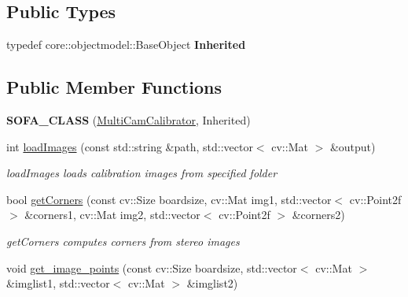 \subsection*{Public Types}
\begin{DoxyCompactItemize}
\item 
\mbox{\label{classsofa_1_1rgbdtracking_1_1_multi_cam_calibrator_a3ce8331b99321a13884a6c0cea468f72}} 
typedef core\+::objectmodel\+::\+Base\+Object {\bfseries Inherited}
\end{DoxyCompactItemize}
\subsection*{Public Member Functions}
\begin{DoxyCompactItemize}
\item 
\mbox{\label{classsofa_1_1rgbdtracking_1_1_multi_cam_calibrator_afe02f454d01807003120c2105b5a7e5e}} 
{\bfseries S\+O\+F\+A\+\_\+\+C\+L\+A\+SS} (\hyperlink{classsofa_1_1rgbdtracking_1_1_multi_cam_calibrator}{Multi\+Cam\+Calibrator}, Inherited)
\item 
int \hyperlink{classsofa_1_1rgbdtracking_1_1_multi_cam_calibrator_a57189fd694afe501755e15c483fecd12}{load\+Images} (const std\+::string \&path, std\+::vector$<$ cv\+::\+Mat $>$ \&output)
\begin{DoxyCompactList}\small\item\em load\+Images loads calibration images from specified folder \end{DoxyCompactList}\item 
bool \hyperlink{classsofa_1_1rgbdtracking_1_1_multi_cam_calibrator_aa59f42320d2dcd3f3d28239ff0fb4eda}{get\+Corners} (const cv\+::\+Size boardsize, cv\+::\+Mat img1, std\+::vector$<$ cv\+::\+Point2f $>$ \&corners1, cv\+::\+Mat img2, std\+::vector$<$ cv\+::\+Point2f $>$ \&corners2)
\begin{DoxyCompactList}\small\item\em get\+Corners computes corners from stereo images \end{DoxyCompactList}\item 
void \hyperlink{classsofa_1_1rgbdtracking_1_1_multi_cam_calibrator_a600d0021721e3a1c5c6714b72b9a42b1}{get\+\_\+image\+\_\+points} (const cv\+::\+Size boardsize, std\+::vector$<$ cv\+::\+Mat $>$ \&imglist1, std\+::vector$<$ cv\+::\+Mat $>$ \&imglist2)

\end{DoxyCompactItemize}
